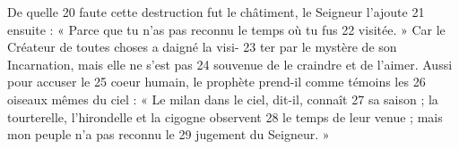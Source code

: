 De quelle	 
20	 	faute cette destruction fut le châtiment, le Seigneur l'ajoute	 
21	 	ensuite : « Parce que tu n'as pas reconnu le temps où tu fus	 
22	 	visitée. » Car le Créateur de toutes choses a daigné la visi-	 
23	 	ter par le mystère de son Incarnation, mais elle ne s'est pas	 
24	 	souvenue de le craindre et de l'aimer. Aussi pour accuser le	 
25	 	coeur humain, le prophète prend-il comme témoins les	 
26	 	oiseaux mêmes du ciel : « Le milan dans le ciel, dit-il, connaît	 
27	 	sa saison ; la tourterelle, l'hirondelle et la cigogne observent	 
28	 	le temps de leur venue ; mais mon peuple n'a pas reconnu le	 
29	 	jugement du Seigneur. »
